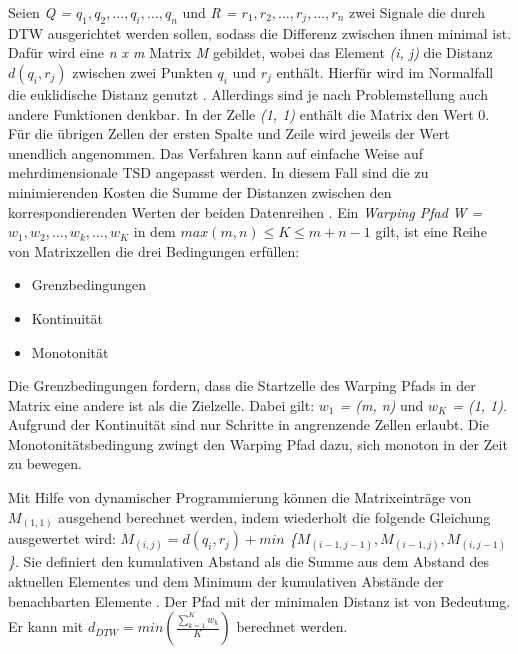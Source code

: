 Seien \emph{Q = $q_{1}, q_{2}, ... , q_{i}, ... , q_{n}$} und \emph{R = $r_{1}, r_{2}, ... , r_{j}, ... , r_{n}$}
zwei Signale die durch \ac{DTW} ausgerichtet werden sollen, sodass die Differenz zwischen ihnen minimal ist.
Dafür wird eine \emph{n x m} Matrix \emph{M} gebildet, wobei das Element \emph{(i, j)} die Distanz \emph{$d(q_{i}, r_{j})$}
zwischen zwei Punkten \emph{$q_{i}$} und \emph{$r_{j}$} enthält.
Hierfür wird im Normalfall die euklidische Distanz genutzt \citep{warren_liao_clustering_2005}.
Allerdings sind je nach Problemstellung auch andere Funktionen denkbar.
In der Zelle \emph{(1, 1)} enthält die Matrix den Wert 0.
Für die übrigen Zellen der ersten Spalte und Zeile wird jeweils der Wert unendlich angenommen.
Das Verfahren kann auf einfache Weise auf mehrdimensionale \ac{TSD} angepasst werden.
In diesem Fall sind die zu minimierenden Kosten die Summe
der Distanzen zwischen den korrespondierenden Werten der beiden Datenreihen \citep{mohammadzade_dynamic_2021}.
Ein \emph{Warping Pfad} \emph{W = $w_{1}, w_{2}, ... , w_{k}, ... , w_{K}$} in dem \emph{$max(m, n) \le K \le m + n - 1$} gilt,
ist eine Reihe von Matrixzellen die drei Bedingungen erfüllen:
\begin{itemize}
    \item Grenzbedingungen
    \item Kontinuität
    \item Monotonität
\end{itemize}
Die Grenzbedingungen fordern, dass die Startzelle des Warping Pfads in der Matrix eine andere ist als die Zielzelle.
Dabei gilt: \emph{$w_{1}$ = (m, n)} und \emph{$w_{K}$ = (1, 1)}.
Aufgrund der Kontinuität sind nur Schritte in angrenzende Zellen erlaubt.
Die Monotonitätsbedingung zwingt den Warping Pfad dazu, sich monoton in der Zeit zu bewegen.

Mit Hilfe von dynamischer Programmierung können die Matrixeinträge von \emph{$M_{(1, 1)}$} ausgehend berechnet werden,
indem wiederholt die folgende Gleichung ausgewertet wird:
\emph{$ M_{(i, j)} = d(q_{i}, r_{j}) + min $ \{$M_{(i - 1, j - 1)}, M_{(i - 1, j)}, M_{(i, j - 1)} $\}}.
Sie definiert den kumulativen Abstand als die Summe aus dem Abstand des aktuellen Elementes
und dem Minimum der kumulativen Abstände der benachbarten Elemente \citep{warren_liao_clustering_2005}.
Der Pfad mit der minimalen Distanz ist von Bedeutung.
Er kann mit \emph{$d_{DTW} = min(\frac{\sum_{k = 1}^{K}w_{k}}{K})$} berechnet werden.


